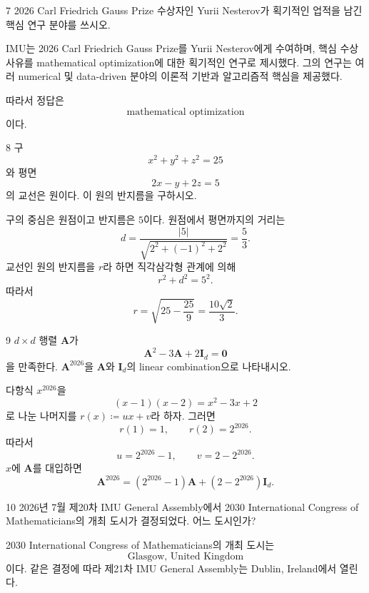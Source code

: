 \begin{problem}{7}
2026 Carl Friedrich Gauss Prize 수상자인 Yurii Nesterov가 획기적인 업적을 남긴 핵심 연구 분야를 쓰시오.
\end{problem}

\begin{solution}
IMU는 2026 Carl Friedrich Gauss Prize를 Yurii Nesterov에게 수여하며, 핵심 수상 사유를 mathematical optimization에 대한 획기적인 연구로 제시했다. 그의 연구는 여러 numerical 및 data-driven 분야의 이론적 기반과 알고리즘적 핵심을 제공했다.

따라서 정답은
\[
    \boxed{\text{mathematical optimization}}
\]
이다.
\end{solution}

\begin{problem}{8}
구
\[
    x^2+y^2+z^2=25
\]
와 평면
\[
    2x-y+2z=5
\]
의 교선은 원이다. 이 원의 반지름을 구하시오.
\end{problem}

\begin{solution}
구의 중심은 원점이고 반지름은 $5$이다. 원점에서 평면까지의 거리는
\[
    d
    =
    \frac{|5|}{\sqrt{2^2+(-1)^2+2^2}}
    =
    \frac{5}{3}.
\]
교선인 원의 반지름을 $r$라 하면 직각삼각형 관계에 의해
\[
    r^2+d^2=5^2.
\]
따라서
\[
    r
    =
    \sqrt{25-\frac{25}{9}}
    =
    \boxed{\frac{10\sqrt2}{3}}.
\]
\end{solution}

\begin{problem}{9}
$d\times d$ 행렬 $\mathbf{A}$가
\[
    \mathbf{A}^2-3\mathbf{A}+2\mathbf{I}_d=\mathbf{0}
\]
을 만족한다. $\mathbf{A}^{2026}$을 $\mathbf{A}$와 $\mathbf{I}_d$의 linear combination으로 나타내시오.
\end{problem}

\begin{solution}
다항식 $x^{2026}$을
\[
    (x-1)(x-2)=x^2-3x+2
\]
로 나눈 나머지를 $r(x)\coloneqq ux+v$라 하자. 그러면
\[
    r(1)=1,
    \qquad
    r(2)=2^{2026}.
\]
따라서
\[
    u=2^{2026}-1,
    \qquad
    v=2-2^{2026}.
\]
$x$에 $\mathbf{A}$를 대입하면
\[
    \boxed{
        \mathbf{A}^{2026}
        =
        (2^{2026}-1)\mathbf{A}
        +(2-2^{2026})\mathbf{I}_d
    }.
\]
\end{solution}

\begin{problem}{10}
2026년 7월 제20차 IMU General Assembly에서 2030 International Congress of Mathematicians의 개최 도시가 결정되었다. 어느 도시인가?
\end{problem}

\begin{solution}
2030 International Congress of Mathematicians의 개최 도시는
\[
    \boxed{\text{Glasgow, United Kingdom}}
\]
이다. 같은 결정에 따라 제21차 IMU General Assembly는 Dublin, Ireland에서 열린다.
\end{solution}
